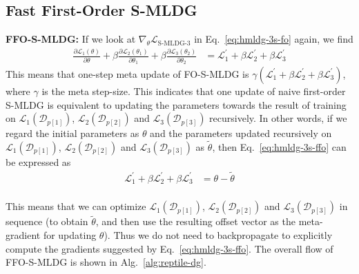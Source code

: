 \documentclass[runningheads]{llncs}
\newcommand{\nameS}{S-MLDG}
\newcommand{\nameFS}{FO-\nameS}
\newcommand{\nameFFS}{FFO-\nameS}
\newcommand{\keypoint}[1]{\vspace{0.1cm}\noindent\textbf{#1}\quad}
\begin{document}
\subsection{Fast First-Order \nameS{}}
\keypoint{\nameFFS{}:} If we look at $\nabla_\theta\mathcal{L}_{\text{\nameS{}-3}}$ in Eq.~\ref{eq:hmldg-3s-fo} again, we find
\small
\begin{equation}
\begin{aligned}
\label{eq:hmldg-3s-ffo}
\frac{\partial \mathcal{L}_1(\theta)}{\partial \theta} + \beta \frac{\partial \mathcal{L}_2(\theta_1)}{\partial \theta_1} + \beta\frac{\partial \mathcal{L}_3(\theta_2)}{\partial \theta_2} & = \mathcal{L}_1^{'} + \beta \mathcal{L}_2^{'} + \beta \mathcal{L}_3^{'}
\end{aligned}
\end{equation}
\normalsize
This means that one-step meta update of \nameFS{} is $\gamma (\mathcal{L}_1^{'} + \beta \mathcal{L}_2^{'} + \beta \mathcal{L}_3^{'})$, where $\gamma$ is the meta step-size. This indicates that one update of naive first-order \nameS{} is equivalent to updating the parameters towards the result of training on $\mathcal{L}_1(\mathcal{D}_{p[1]})$, $\mathcal{L}_2(\mathcal{D}_{p[2]})$ and $\mathcal{L}_3(\mathcal{D}_{p[3]})$ recursively. In other words, if we regard the initial parameters as $\theta$ and the parameters updated recursively on $\mathcal{L}_1(\mathcal{D}_{p[1]})$, $\mathcal{L}_2(\mathcal{D}_{p[2]})$ and $\mathcal{L}_3(\mathcal{D}_{p[3]})$ as $\tilde{\theta}$, then Eq.~\ref{eq:hmldg-3s-ffo} can be expressed as
\small
\begin{equation}
\begin{aligned}
\label{eq:hmldg-3s-ffo-interpolation}
\mathcal{L}_1^{'} + \beta \mathcal{L}_2^{'} + \beta \mathcal{L}_3^{'} & = \theta - \tilde{\theta}  \\
\end{aligned}
\end{equation}
\normalsize

This means that we can optimize $\mathcal{L}_1(\mathcal{D}_{p[1]})$, $\mathcal{L}_2(\mathcal{D}_{p[2]})$ and $\mathcal{L}_3(\mathcal{D}_{p[3]})$ in sequence (to obtain $\tilde{\theta}$, and then use the resulting offset vector as the meta-gradient for updating $\theta$). Thus we do not need to backpropagate to explicitly compute the gradients suggested by Eq.~\ref{eq:hmldg-3s-ffo}. 
The overall flow of \nameFFS{} is shown in Alg.~\ref{alg:reptile-dg}.
\end{document}
